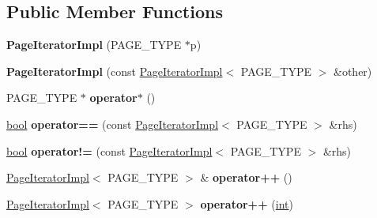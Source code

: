 \subsection*{Public Member Functions}
\begin{DoxyCompactItemize}
\item 
\mbox{\label{classv8_1_1internal_1_1PageIteratorImpl_adb3592cd7edc0980b3c9c294da0c3b85}} 
{\bfseries Page\+Iterator\+Impl} (P\+A\+G\+E\+\_\+\+T\+Y\+PE $\ast$p)
\item 
\mbox{\label{classv8_1_1internal_1_1PageIteratorImpl_aff9e1c0bb9944b0d0cdd3cfe93c56e64}} 
{\bfseries Page\+Iterator\+Impl} (const \mbox{\hyperlink{classv8_1_1internal_1_1PageIteratorImpl}{Page\+Iterator\+Impl}}$<$ P\+A\+G\+E\+\_\+\+T\+Y\+PE $>$ \&other)
\item 
\mbox{\label{classv8_1_1internal_1_1PageIteratorImpl_a47beffe2efab90f308e431df96d9913e}} 
P\+A\+G\+E\+\_\+\+T\+Y\+PE $\ast$ {\bfseries operator$\ast$} ()
\item 
\mbox{\label{classv8_1_1internal_1_1PageIteratorImpl_aac5c0b957c3b5900af837419669ccc8a}} 
\mbox{\hyperlink{classbool}{bool}} {\bfseries operator==} (const \mbox{\hyperlink{classv8_1_1internal_1_1PageIteratorImpl}{Page\+Iterator\+Impl}}$<$ P\+A\+G\+E\+\_\+\+T\+Y\+PE $>$ \&rhs)
\item 
\mbox{\label{classv8_1_1internal_1_1PageIteratorImpl_a4296656a745e5818ec909a35381dd75d}} 
\mbox{\hyperlink{classbool}{bool}} {\bfseries operator!=} (const \mbox{\hyperlink{classv8_1_1internal_1_1PageIteratorImpl}{Page\+Iterator\+Impl}}$<$ P\+A\+G\+E\+\_\+\+T\+Y\+PE $>$ \&rhs)
\item 
\mbox{\label{classv8_1_1internal_1_1PageIteratorImpl_a8117b8d7060c31f97a80c396050d022b}} 
\mbox{\hyperlink{classv8_1_1internal_1_1PageIteratorImpl}{Page\+Iterator\+Impl}}$<$ P\+A\+G\+E\+\_\+\+T\+Y\+PE $>$ \& {\bfseries operator++} ()
\item 
\mbox{\label{classv8_1_1internal_1_1PageIteratorImpl_af32b2b7f30b2bcab4eabc9c9ab972d6c}} 
\mbox{\hyperlink{classv8_1_1internal_1_1PageIteratorImpl}{Page\+Iterator\+Impl}}$<$ P\+A\+G\+E\+\_\+\+T\+Y\+PE $>$ {\bfseries operator++} (\mbox{\hyperlink{classint}{int}})
\end{DoxyCompactItemize}
